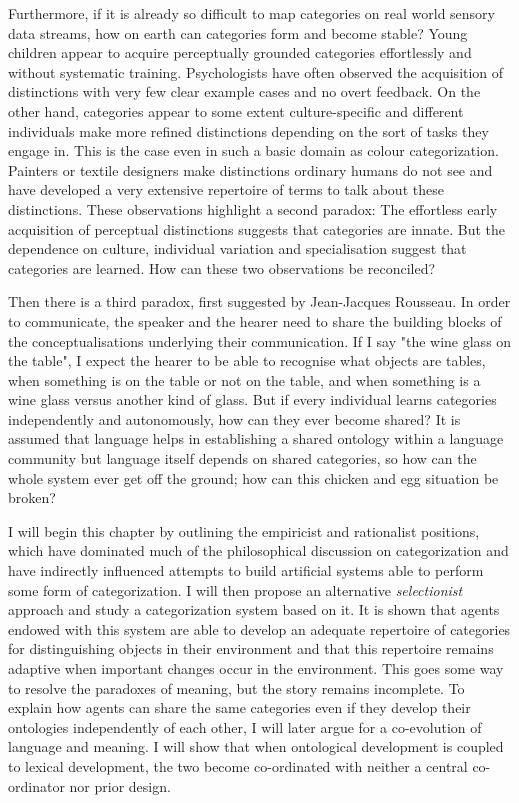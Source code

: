 Furthermore, if it is already so difficult to map
categories on real world sensory data streams, how 
on earth can categories form and become stable? 
Young children appear to acquire perceptually 
grounded categories effortlessly and without systematic 
training. Psychologists have often observed the 
acquisition of distinctions
with very few clear example cases and no overt feedback. 
On the other hand, categories appear to 
some extent culture-specific and different 
individuals make more refined distinctions depending
on the sort of tasks they engage in. This is 
the case even in such a basic domain as colour categorization. 
Painters or textile designers make distinctions ordinary 
humans do not see and have developed a very extensive
repertoire of terms to talk about these distinctions. 
These observations highlight a second paradox: The 
effortless early acquisition of perceptual distinctions 
suggests that categories 
are innate. But the dependence on culture, individual
variation and specialisation suggest that categories
are learned. How can these two observations be reconciled? 

Then there is a third paradox, first suggested
by Jean-Jacques Rousseau. In order to communicate,
the speaker and the hearer need to share the building
blocks of the conceptualisations underlying their communication. 
If I say "the wine glass on the table", I expect 
the hearer to be able to recognise what objects are 
tables, when something is on the table or not on the table, and 
when something is a wine glass versus another kind 
of glass. But if every individual learns categories independently
and autonomously, how can they ever become shared? It is 
assumed that language helps in establishing a shared ontology within 
a language community but language itself depends on 
shared categories, so how can the whole system ever 
get off the ground; how can this chicken and egg situation
be broken?

I will begin this chapter by outlining the empiricist 
and rationalist positions, which have 
dominated much of the philosophical discussion on 
categorization and have indirectly influenced attempts 
to build artificial systems able to perform some form
of categorization. 
I will then propose an alternative {\itshape selectionist} approach
and study a categorization system based on it. It is 
shown that agents endowed with this system are able
to develop an adequate repertoire of categories for 
distinguishing objects in their environment and that 
this repertoire remains adaptive when important changes 
occur in the environment. This goes some way to 
resolve the paradoxes of meaning, but the story remains
incomplete. To explain how agents can share the same 
categories even if they develop their ontologies 
independently of each other, I will later argue for
a co-evolution of language and meaning. I will show
that when ontological development is coupled to lexical 
development, the two become co-ordinated with neither
a central co-ordinator nor prior design. 

